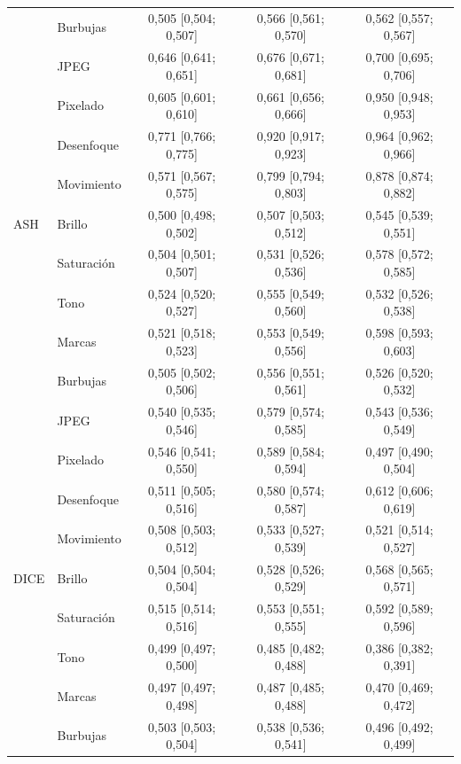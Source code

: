 {\begin{longtable}{llccc}
 & Burbujas & 0{,}505 [0{,}504; 0{,}507] & 0{,}566 [0{,}561; 0{,}570] & 0{,}562 [0{,}557; 0{,}567] \\
 & JPEG & 0{,}646 [0{,}641; 0{,}651] & 0{,}676 [0{,}671; 0{,}681] & 0{,}700 [0{,}695; 0{,}706] \\
 & Pixelado & 0{,}605 [0{,}601; 0{,}610] & 0{,}661 [0{,}656; 0{,}666] & 0{,}950 [0{,}948; 0{,}953] \\
 & Desenfoque & 0{,}771 [0{,}766; 0{,}775] & 0{,}920 [0{,}917; 0{,}923] & 0{,}964 [0{,}962; 0{,}966] \\
 & Movimiento & 0{,}571 [0{,}567; 0{,}575] & 0{,}799 [0{,}794; 0{,}803] & 0{,}878 [0{,}874; 0{,}882] \\
\midrule
ASH & Brillo & 0{,}500 [0{,}498; 0{,}502] & 0{,}507 [0{,}503; 0{,}512] & 0{,}545 [0{,}539; 0{,}551] \\
 & Saturación & 0{,}504 [0{,}501; 0{,}507] & 0{,}531 [0{,}526; 0{,}536] & 0{,}578 [0{,}572; 0{,}585] \\
 & Tono & 0{,}524 [0{,}520; 0{,}527] & 0{,}555 [0{,}549; 0{,}560] & 0{,}532 [0{,}526; 0{,}538] \\
 & Marcas & 0{,}521 [0{,}518; 0{,}523] & 0{,}553 [0{,}549; 0{,}556] & 0{,}598 [0{,}593; 0{,}603] \\
 & Burbujas & 0{,}505 [0{,}502; 0{,}506] & 0{,}556 [0{,}551; 0{,}561] & 0{,}526 [0{,}520; 0{,}532] \\
 & JPEG & 0{,}540 [0{,}535; 0{,}546] & 0{,}579 [0{,}574; 0{,}585] & 0{,}543 [0{,}536; 0{,}549] \\
 & Pixelado & 0{,}546 [0{,}541; 0{,}550] & 0{,}589 [0{,}584; 0{,}594] & 0{,}497 [0{,}490; 0{,}504] \\
 & Desenfoque & 0{,}511 [0{,}505; 0{,}516] & 0{,}580 [0{,}574; 0{,}587] & 0{,}612 [0{,}606; 0{,}619] \\
 & Movimiento & 0{,}508 [0{,}503; 0{,}512] & 0{,}533 [0{,}527; 0{,}539] & 0{,}521 [0{,}514; 0{,}527] \\
\midrule
DICE & Brillo & 0{,}504 [0{,}504; 0{,}504] & 0{,}528 [0{,}526; 0{,}529] & 0{,}568 [0{,}565; 0{,}571] \\
 & Saturación & 0{,}515 [0{,}514; 0{,}516] & 0{,}553 [0{,}551; 0{,}555] & 0{,}592 [0{,}589; 0{,}596] \\
 & Tono & 0{,}499 [0{,}497; 0{,}500] & 0{,}485 [0{,}482; 0{,}488] & 0{,}386 [0{,}382; 0{,}391] \\
 & Marcas & 0{,}497 [0{,}497; 0{,}498] & 0{,}487 [0{,}485; 0{,}488] & 0{,}470 [0{,}469; 0{,}472] \\
 & Burbujas & 0{,}503 [0{,}503; 0{,}504] & 0{,}538 [0{,}536; 0{,}541] & 0{,}496 [0{,}492; 0{,}499] \\

\end{longtable}}
